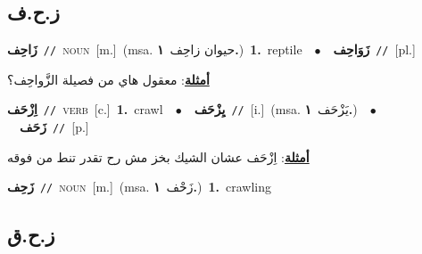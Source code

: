 \documentclass[10pt,a4paper,twoside]{article} %
\begin{document}
\begin{multicols}{2}
{{{{{{{\vspace{-3mm}
\subsection*{\color{blue}\foreignlanguage{arabic}{ز.ح.ف}\color{blue}{}} 

{\setlength\topsep{0pt}\textbf{\foreignlanguage{arabic}{زَاحِف}}\ {\color{gray}\texttt{//}\color{black}}\ \textsc{noun}\ [m.]\ \color{gray}(msa. \foreignlanguage{arabic}{حيوان زاحِف}~\foreignlanguage{arabic}{\textbf{١.}})\color{black}\ \textbf{1.}~reptile\ \ $\bullet$\ \ \setlength\topsep{0pt}\textbf{\foreignlanguage{arabic}{زَوَاحِف}}\ {\color{gray}\texttt{//}\color{black}}\ [pl.]\  \begin{flushright}\color{gray}\foreignlanguage{arabic}{\textbf{\underline{\foreignlanguage{arabic}{أمثلة}}}: معقول هاي من فصيلة الزَّواحِف؟}\end{flushright}\color{black}} \vspace{2mm}

{\setlength\topsep{0pt}\textbf{\foreignlanguage{arabic}{اِزْحَف}}\ {\color{gray}\texttt{//}\color{black}}\ \textsc{verb}\ [c.]\ \textbf{1.}~crawl\ \ $\bullet$\ \ \setlength\topsep{0pt}\textbf{\foreignlanguage{arabic}{يِزْحَف}}\ {\color{gray}\texttt{//}\color{black}}\ [i.]\ \color{gray}(msa. \foreignlanguage{arabic}{يَزْحَف}~\foreignlanguage{arabic}{\textbf{١.}})\color{black}\ \ $\bullet$\ \ \setlength\topsep{0pt}\textbf{\foreignlanguage{arabic}{زَحَف}}\ {\color{gray}\texttt{//}\color{black}}\ [p.]\  \begin{flushright}\color{gray}\foreignlanguage{arabic}{\textbf{\underline{\foreignlanguage{arabic}{أمثلة}}}: اِزْحَف عشان الشيك بخز مش رح تقدر تنط من فوقه}\end{flushright}\color{black}} \vspace{2mm}

{\setlength\topsep{0pt}\textbf{\foreignlanguage{arabic}{زَحِف}}\ {\color{gray}\texttt{//}\color{black}}\ \textsc{noun}\ [m.]\ \color{gray}(msa. \foreignlanguage{arabic}{زَحْف}~\foreignlanguage{arabic}{\textbf{١.}})\color{black}\ \textbf{1.}~crawling\ 

\vspace{-3mm}
\subsection*{\color{blue}\foreignlanguage{arabic}{ز.ح.ق}\color{blue}{}} 

}}}}}}}}
\end{multicols}
\end{document}
